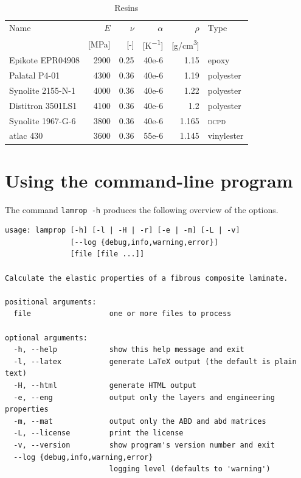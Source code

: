 \documentclass[a4paper,landscape,oneside,11pt,twocolumn]{memoir}
\begin{document}
\begin{table}[!htbp]
  \centering
  \caption{\label{tb:resins}Resins}
  \begin{tabular}{lrrrrl}%
      Name & $E$ & $\nu$ & $\alpha$ & $\rho$ & Type\\
      & [\si{MPa}] & [-] & [\si{K^{-1}}] & [\si{g/cm^3}]\\
    \midrule
      Epikote EPR04908 & 2900 & 0.25 & 40e-6 & 1.15 & epoxy\\
      Palatal P4-01 & 4300 & 0.36 & 40e-6 & 1.19 & polyester\\
      Synolite 2155-N-1 & 4000 & 0.36 & 40e-6 & 1.22 & polyester\\
      Distitron 3501LS1 & 4100 & 0.36 & 40e-6 & 1.2 & polyester\\
      Synolite 1967-G-6 & 3800 & 0.36 & 40e-6 & 1.165 & \textsc{dcpd}\\
      atlac 430 & 3600 & 0.36 & 55e-6 & 1.145 & vinylester\\
  \end{tabular}
\end{table}

\section{Using the command-line program} %

The command \texttt{lamrop -h} produces the following overview of the options.

\begin{lstlisting}[style=plain]
usage: lamprop [-h] [-l | -H | -r] [-e | -m] [-L | -v]
               [--log {debug,info,warning,error}]
               [file [file ...]]

Calculate the elastic properties of a fibrous composite laminate.

positional arguments:
  file                  one or more files to process

optional arguments:
  -h, --help            show this help message and exit
  -l, --latex           generate LaTeX output (the default is plain text)
  -H, --html            generate HTML output
  -e, --eng             output only the layers and engineering properties
  -m, --mat             output only the ABD and abd matrices
  -L, --license         print the license
  -v, --version         show program's version number and exit
  --log {debug,info,warning,error}
                        logging level (defaults to 'warning')
\end{lstlisting}
\end{document}
